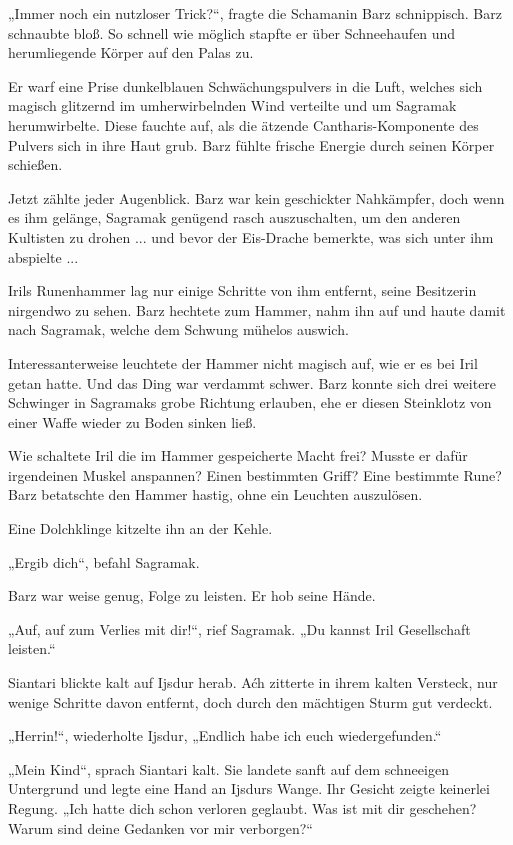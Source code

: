 „Immer noch ein nutzloser Trick?“, fragte die Schamanin Barz schnippisch. Barz schnaubte bloß. So schnell wie möglich stapfte er über Schneehaufen und herumliegende Körper auf den Palas zu.

Er warf eine Prise dunkelblauen Schwächungspulvers in die Luft, welches sich magisch glitzernd im umherwirbelnden Wind verteilte und um Sagramak herumwirbelte. Diese fauchte auf, als die ätzende Cantharis-Komponente des Pulvers sich in ihre Haut grub. Barz fühlte frische Energie durch seinen Körper schießen.

Jetzt zählte jeder Augenblick. Barz war kein geschickter Nahkämpfer, doch wenn es ihm gelänge, Sagramak genügend rasch auszuschalten, um den anderen Kultisten zu drohen ... und bevor der Eis-Drache bemerkte, was sich unter ihm abspielte ...

Irils Runenhammer lag nur einige Schritte von ihm entfernt, seine Besitzerin nirgendwo zu sehen. Barz hechtete zum Hammer, nahm ihn auf und haute damit nach Sagramak, welche dem Schwung mühelos auswich.

Interessanterweise leuchtete der Hammer nicht magisch auf, wie er es bei Iril getan hatte. Und das Ding war verdammt schwer. Barz konnte sich drei weitere Schwinger in Sagramaks grobe Richtung erlauben, ehe er diesen Steinklotz von einer Waffe wieder zu Boden sinken ließ.

Wie schaltete Iril die im Hammer gespeicherte Macht frei? Musste er dafür irgendeinen Muskel anspannen? Einen bestimmten Griff? Eine bestimmte Rune? Barz betatschte den Hammer hastig, ohne ein Leuchten auszulösen.

Eine Dolchklinge kitzelte ihn an der Kehle.

„Ergib dich“, befahl Sagramak.

Barz war weise genug, Folge zu leisten. Er hob seine Hände.

„Auf, auf zum Verlies mit dir!“, rief Sagramak. „Du kannst Iril Gesellschaft leisten.“



\trennzeichen



Siantari blickte kalt auf Ijsdur herab. Aćh zitterte in ihrem kalten Versteck, nur wenige Schritte davon entfernt, doch durch den mächtigen Sturm gut verdeckt.

„Herrin!“, wiederholte Ijsdur, „Endlich habe ich euch wiedergefunden.“

„Mein Kind“, sprach Siantari kalt. Sie landete sanft auf dem schneeigen Untergrund und legte eine Hand an Ijsdurs Wange. Ihr Gesicht zeigte keinerlei Regung. „Ich hatte dich schon verloren geglaubt. Was ist mit dir geschehen? Warum sind deine Gedanken vor mir verborgen?“

